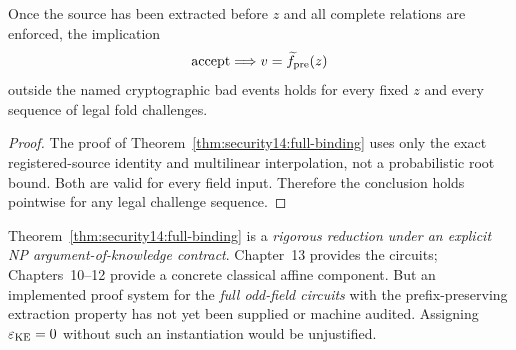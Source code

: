 \begin{proposition}\label{prop:security14:uniform-not-needed}
Once the source has been
extracted before $z$ and
all complete relations are
enforced, the implication
\[
 \mathrm{accept}\Longrightarrow
 v=\widetilde f_{\rm pre}(z)
\]
outside the named cryptographic
bad events holds for every
fixed $z$ and every sequence
of legal fold challenges.
\end{proposition}
\begin{proof}
The proof of
Theorem~\ref{thm:security14:full-binding}
uses only the exact
registered-source identity
and multilinear
interpolation, not a
probabilistic root bound.
Both are valid for every
field input. Therefore
the conclusion holds
pointwise for any legal
challenge sequence.
\end{proof}

\begin{remark}
Theorem~\ref{thm:security14:full-binding}
is a \emph{rigorous reduction under an
explicit NP argument-of-knowledge
contract}. Chapter~13 provides the
circuits; Chapters~10--12 provide
a concrete classical affine component.
But an implemented proof system
for the \emph{full odd-field circuits}
with the prefix-preserving extraction
property has not yet been supplied
or machine audited. Assigning
$\varepsilon_{\rm KE}=0$ without
such an instantiation would be
unjustified.
\end{remark}
